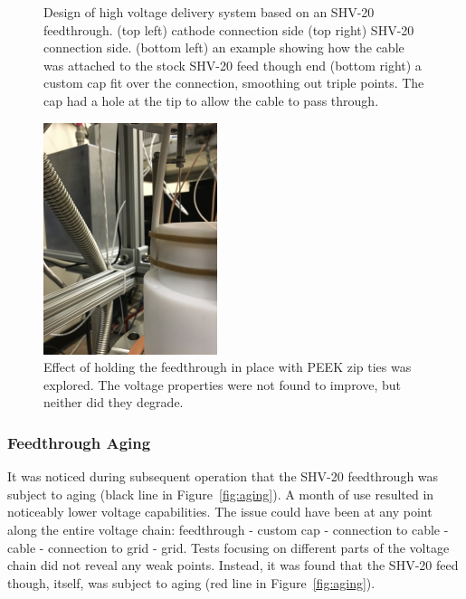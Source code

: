 \begin{figure}[htbp]
\begin{minipage}{0.4\textwidth}
    \end{minipage}
\caption{Design of high voltage delivery system based on an \acs{SHV}-20 feedthrough. (top left) cathode connection side (top right) \acs{SHV}-20 connection side. (bottom left) an example showing how the cable was attached to the stock \acs{SHV}-20 feed though end (bottom right) a custom cap fit over the connection, smoothing out triple points. The cap had a hole at the tip to allow the cable to pass through.}
 \label{fig:shv20}
\end{figure}

 \begin{figure}[htbp]
\begin{center}
\includegraphics[width=2in, angle=-90]{figures/testbed/ft3_5.jpg}
\caption{Effect of holding the feedthrough in place with \acs{PEEK} zip ties was explored. The voltage properties were not found to improve, but neither did they degrade.}
\label{fig:zip_ties}
\end{center}
\end{figure}


 \FloatBarrier
\subsubsection{Feedthrough Aging}
\label{sec:aging}
It was noticed during subsequent operation that the \ac{SHV}-20 feedthrough was subject to aging (black line in Figure~\ref{fig:aging}). A month of use resulted in noticeably lower voltage capabilities. The issue could have been at any point along the entire voltage chain: feedthrough - custom cap - connection to cable - cable - connection to grid - grid. Tests focusing on different parts of the voltage chain did not reveal any weak points. Instead, it was found that the \ac{SHV}-20 feed though, itself, was subject to aging (red line in Figure~\ref{fig:aging}). 


